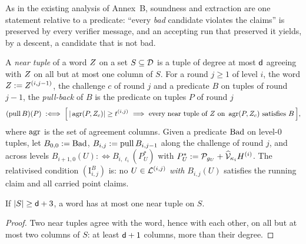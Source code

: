 As in the existing analysis of Annex~B, soundness and extraction are one statement relative to a predicate: ``every \emph{bad} candidate violates the claims'' is preserved by every verifier message, and an accepting run that preserved it yields, by a descent, a candidate that is not bad.

\begin{definition}\label{def:pull}
A \emph{near tuple} of a word $Z$ on a set $S\subseteq\mathcal{D}$ is a tuple of degree at most $\mathsf{d}$ agreeing with $Z$ on all but at most one column of $S$. For a round $j\ge1$ of level $i$, the word $Z:=Z^{(i,j-1)}$, the challenge $c$ of round $j$ and a predicate $B$ on tuples of round $j-1$, the \emph{pull-back} of $B$ is the predicate on tuples $P$ of round $j$
\[
(\pull B)(P)\;:\Longleftrightarrow\;\Bigl[\,|\agrset(P,\orc_c)|\ge\agr^{(i,j)}\ \Longrightarrow\ \text{every near tuple of }\orc\text{ on }\agrset(P,\orc_c)\text{ satisfies }B\,\Bigr],
\]
where $\operatorname{agr}$ is the set of agreement columns. Given a predicate $\mathrm{Bad}$ on level-$0$ tuples, let $B_{0,0}:=\mathrm{Bad}$, $B_{i,j}:=\operatorname{pull} B_{i,j-1}$ along the challenge of round $j$, and across levels $B_{i+1,0}(U):\Longleftrightarrow B_{i,\ell_i}(P^\ast_U)$ with $P^\ast_U:=\mathcal{P}_{g_U}+\widehat{\mathcal{V}}_{\kappa_i}H^{(i)}$. The relativised condition $(\mathrm I^B_{i,j})$ is: no $U\in\mathcal{L}^{(i,j)}$ \emph{with $B_{i,j}(U)$} satisfies the running claim and all carried point claims.
\end{definition}

\begin{lemma}\label{lem:near}
If $|S|\ge\mathsf{d}+3$, a word has at most one near tuple on $S$.
\end{lemma}
\begin{proof}
Two near tuples agree with the word, hence with each other, on all but at most two columns of $S$: at least $\mathsf{d}+1$ columns, more than their degree.
\end{proof}

